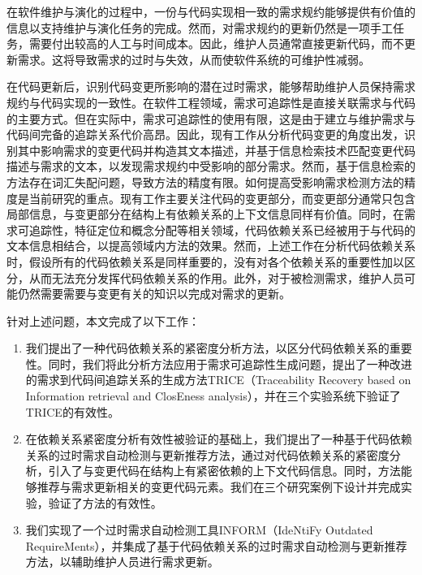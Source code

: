 \documentclass[twoside, master]{NJUthesis}
\theoremstyle{plain}
\begin{document}
\begin{englishabstract}

在软件维护与演化的过程中，一份与代码实现相一致的需求规约能够提供有价值的信息以支持维护与演化任务的完成。然而，对需求规约的更新仍然是一项手工任务，需要付出较高的人工与时间成本。因此，维护人员通常直接更新代码，而不更新需求。这将导致需求的过时与失效，从而使软件系统的可维护性减弱。

在代码更新后，识别代码变更所影响的潜在过时需求，能够帮助维护人员保持需求规约与代码实现的一致性。在软件工程领域，需求可追踪性是直接关联需求与代码的主要方式。但在实际中，需求可追踪性的使用有限，这是由于建立与维护需求与代码间完备的追踪关系代价高昂。因此，现有工作从分析代码变更的角度出发，识别其中影响需求的变更代码并构造其文本描述，并基于信息检索技术匹配变更代码描述与需求的文本，以发现需求规约中受影响的部分需求。然而，基于信息检索的方法存在词汇失配问题，导致方法的精度有限。如何提高受影响需求检测方法的精度是当前研究的重点。现有工作主要关注代码的变更部分，而变更部分通常只包含局部信息，与变更部分在结构上有依赖关系的上下文信息同样有价值。同时，在需求可追踪性，特征定位和概念分配等相关领域，代码依赖关系已经被用于与代码的文本信息相结合，以提高领域内方法的效果。然而，上述工作在分析代码依赖关系时，假设所有的代码依赖关系是同样重要的，没有对各个依赖关系的重要性加以区分，从而无法充分发挥代码依赖关系的作用。此外，对于被检测需求，维护人员可能仍然需要需要与变更有关的知识以完成对需求的更新。

针对上述问题，本文完成了以下工作：
\begin{enumerate}
  \item 我们提出了一种代码依赖关系的紧密度分析方法，以区分代码依赖关系的重要性。同时，我们将此分析方法应用于需求可追踪性生成问题，提出了一种改进的需求到代码间追踪关系的生成方法TRICE（Traceability Recovery based on Information retrieval and ClosEness analysis），并在三个实验系统下验证了TRICE的有效性。
  \item 在依赖关系紧密度分析有效性被验证的基础上，我们提出了一种基于代码依赖关系的过时需求自动检测与更新推荐方法，通过对代码依赖关系的紧密度分析，引入了与变更代码在结构上有紧密依赖的上下文代码信息。同时，方法能够推荐与需求更新相关的变更代码元素。我们在三个研究案例下设计并完成实验，验证了方法的有效性。
  \item 我们实现了一个过时需求自动检测工具INFORM（IdeNtiFy Outdated RequireMents），并集成了基于代码依赖关系的过时需求自动检测与更新推荐方法，以辅助维护人员进行需求更新。
\end{enumerate}


\end{englishabstract}
\end{document}

